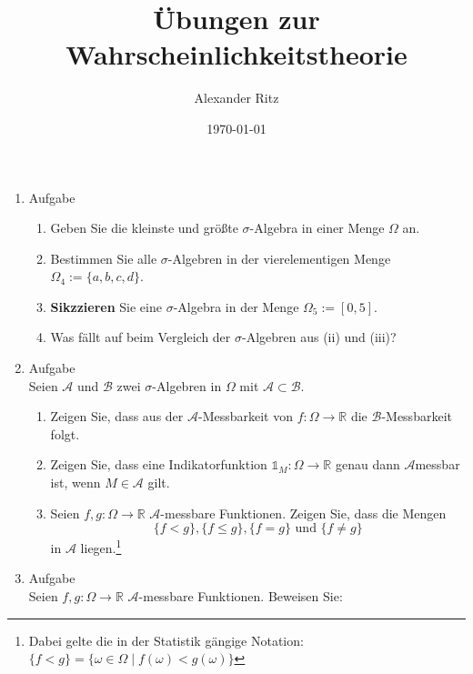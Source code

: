 \documentclass[12pt,a4paper]{article}
\title{Übungen zur Wahrscheinlichkeitstheorie}
\author{Alexander Ritz}
\date{\today}
\begin{document}
\maketitle

\begin{enumerate}

\item Aufgabe 
\begin{enumerate}[label=(\roman*)]

\item Geben Sie die kleinste und größte $\sigma$-Algebra in einer Menge $\Omega$ an.

\item Bestimmen Sie alle $\sigma$-Algebren in der vierelementigen Menge $\Omega_4:=\{a, b, c, d\}$.

\item\textbf{Sikzzieren} Sie eine $\sigma$-Algebra in der Menge $\Omega_5:= \left[0, 5 \right]$.

\item Was fällt auf beim Vergleich der $\sigma$-Algebren aus (ii) und (iii)?

\end{enumerate}


\item Aufgabe \\
Seien $\mathscr{A}$ und $\mathscr{B}$ zwei $\sigma$-Algebren in $\Omega$ mit $\mathscr{A} \subset \mathscr{B}$.
\begin{enumerate}[label=(\roman*)]

\item Zeigen Sie, dass aus der $\mathscr{A}$-Messbarkeit von $f:\Omega \to \mathbb{R}$ die $\mathscr{B}$-Messbarkeit folgt.

\item Zeigen Sie, dass eine Indikatorfunktion $\mathds{1}_M:\Omega \to \mathbb{R}$ genau dann $\mathscr{A}$messbar ist, wenn $M \in \mathscr{A}$ gilt.

\item Seien $f, g: \Omega\to \mathbb{R}$ $\mathscr{A}$-messbare Funktionen. Zeigen Sie, dass die Mengen \[\{f < g\}, \{f \leq g\}, \{f = g\}\text{ und }\{ f \neq g\}\] in $\mathscr{A}$ liegen.\footnote{Dabei gelte die in der Statistik gängige Notation: $\{f < g\} = \{\omega \in \Omega \mid f(\omega) < g(\omega)\}$}


\end{enumerate}

\item Aufgabe \\
Seien $f, g: \Omega\to \mathbb{R}$ $\mathscr{A}$-messbare Funktionen.  Beweisen Sie:
\begin{enumerate}[label=(\roman*)]


\end{enumerate}
\end{enumerate}
\end{document}
